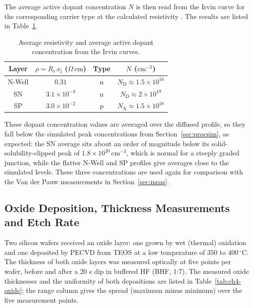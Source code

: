 The average active dopant concentration $N$ is then read from the Irvin curve for the corresponding carrier type at the calculated resistivity \cite{et4icp_manual}. The results are listed in Table~\ref{tab:ch4-conc}.

\begin{table}[htbp]
  \centering
  \caption{Average resistivity and average active dopant concentration
  from the Irvin curves.}
  \label{tab:ch4-conc}
  \begin{tabular}{cccc}
    \toprule
    Layer & $\rho = R_\mathrm{s}\,x_\mathrm{j}$ ($\Omega\,\mathrm{cm}$) & Type & $N$ ($\mathrm{cm^{-3}}$) \\
    \midrule
    N-Well & $0.31$              & n & $N_\mathrm{D} \approx 1.5\times10^{16}$ \\
    SN     & $3.1\times10^{-3}$  & n & $N_\mathrm{D} \approx 2\times10^{19}$   \\
    SP     & $3.0\times10^{-2}$  & p & $N_\mathrm{A} \approx 1.5\times10^{18}$ \\
    \bottomrule
  \end{tabular}
\end{table}

These dopant concentration values are averaged over the diffused profile, so they fall below the simulated peak concentrations from Section~\ref{sec:procsim}, as expected: the SN average sits about an order of magnitude below its solid-solubility-clipped peak of $1.8\times10^{20}\,\mathrm{cm^{-3}}$, which is normal for a steeply graded junction, while the flatter N-Well and SP profiles give averages close to the simulated levels. These three concentrations are used again for comparison with the Van der Pauw measurements in Section~\ref{sec:meas}.


\subsection{Oxide Deposition, Thickness Measurements and Etch Rate}
Two silicon wafers received an oxide layer: one grown by wet (thermal) oxidation and one deposited by PECVD from TEOS at a low temperature of $350$ to $400\,^\circ$C. The thickness of both oxide layers was measured optically at five points per wafer, before and after a 20 s dip in buffered HF (BHF, 1:7). The measured oxide thicknesses and the uniformity of both depositions are listed in Table~\ref{tab:ch4-oxide}; the range column gives the spread (maximum minus minimum) over the five measurement points.

